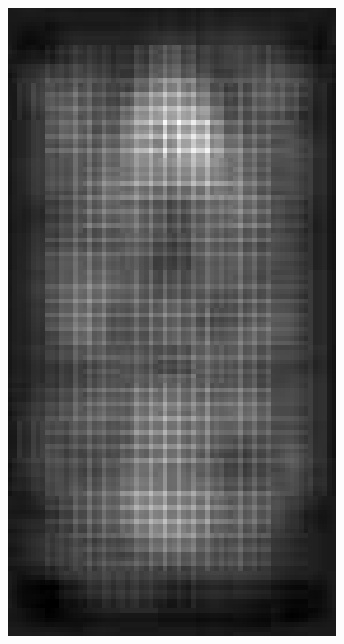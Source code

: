\documentclass[thesis.tex]{subfiles}
\begin{document}
\begin{figure}[tb]
{\begin{subfigure}[t]{0.17\textwidth}
		\includegraphics[width=\textwidth]{img/inriaExampleDescriptorSvmMax.pdf}
		\caption{}
		\label{fig:inriaExampleDescriptorSvmMax}
		\vspace{2mm}
	\end{subfigure}
	\begin{subfigure}[t]{0.17\textwidth}

\end{subfigure}}
\end{figure}
\end{document}
